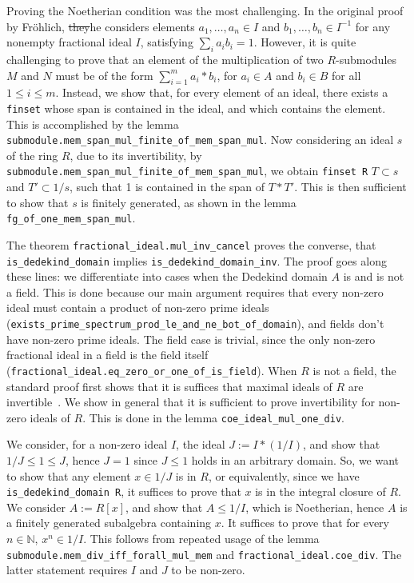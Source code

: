 \documentclass[a4paper,USenglish,cleveref, autoref, thm-restate]{lipics-v2021}
\newcommand{\lean}[1]{\texttt{#1}\xspace} %
\begin{document}
Proving the Noetherian condition was the most challenging. In the original proof by Fr\"ohlich, \st{they}he considers elements $a_1, \dots, a_n \in I$ and $b_1, \dots, b_n \in I^{-1}$ for any nonempty fractional ideal $I$,
satisfying $ \sum_i a_i b_i = 1 $.
However, it is quite challenging to prove that an element of the multiplication of two $R$-submodules $M$ and $N$ must be of the form $\sum_{i = 1}^m a_i*b_i$, for $a_i \in A$ and $b_i \in B$ for all $1 \leq i \leq m$.
Instead, we show that, for every element of an ideal, there exists a \lean{finset} whose span is contained in the ideal, and which contains the element.
This is accomplished by the lemma \lean{submodule.mem\_span\_mul\_finite\_of\_mem\_span\_mul}.
Now considering an ideal $s$ of the ring $R$, due to its invertibility, by \lean{submodule.mem\_span\_mul\_finite\_of\_mem\_span\_mul}, we obtain \lean{finset R} $T \subset s$ and $T' \subset 1/s$, such that 1 is contained in the span of $T*T'$.
This is then sufficient to show that $s$ is finitely generated, as shown in the lemma \lean{fg\_of\_one\_mem\_span\_mul}.

The theorem \lean{fractional\_ideal.mul\_inv\_cancel} proves the converse, that \lean{is\_dedekind\_domain} implies \lean{is\_dedekind\_domain\_inv}.
The proof goes along these lines: we differentiate into cases when the Dedekind domain $A$ is and is not a field.
This is done because our main argument requires that every non-zero ideal must contain a product of non-zero prime ideals (\lean{exists\_prime\_spectrum\_prod\_le\_and\_ne\_bot\_of\_domain}),
and fields don't have non-zero prime ideals.
The field case is trivial, since the only non-zero fractional ideal in a field is the field itself (\lean{fractional\_ideal.eq\_zero\_or\_one\_of\_is\_field}).
When $R$ is not a field, the standard proof first shows that it is suffices that maximal ideals of $R$ are invertible~\cite[Proposition 3.8]{Neukirch}.
We show in general that it is sufficient to prove invertibility for non-zero ideals of $R$.
This is done in the lemma \lean{coe\_ideal\_mul\_one\_div}.

We consider, for a non-zero ideal $I$, the ideal $J := I * (1/I)$, and show that $1/J \leq 1 \le J$, hence $J = 1$ since $J \le 1$ holds in an arbitrary domain. So, we want to show that any element $x \in 1/J$ is in $R$, or equivalently, since we have \lean{is\_dedekind\_domain R}, it suffices to prove that $x$ is in the integral closure of $R$. We consider $A := R[x]$, and show that $A \leq 1/I$, which is Noetherian, hence $A$ is a finitely generated subalgebra containing $x$. It suffices to prove that for every $n \in \mathbb{N}$, $x^n \in 1/I$. This follows from repeated usage of the lemma \lean{submodule.mem\_div\_iff\_forall\_mul\_mem} and \lean{fractional\_ideal.coe\_div}. The latter statement requires $I$ and $J$ to be non-zero. 
\end{document}
